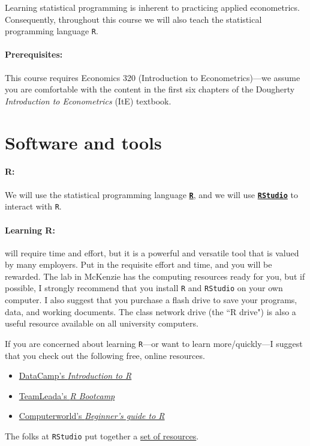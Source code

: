 \documentclass[10pt]{article}
\begin{document}
Learning statistical programming is inherent to practicing applied econometrics. Consequently, throughout this course we will also teach the statistical programming language \texttt{{R}}.

\paragraph{Prerequisites:} This course requires Economics 320 (Introduction to Econometrics)---we assume you are comfortable with the content in the first six chapters of the Dougherty \textit{Introduction to Econometrics} (ItE) textbook.

\section*{Software and tools}

\paragraph{R:} We will use the statistical programming language \href{https://www.r-project.org/}{\textbf{\texttt{R}}}, and we will use \href{https://www.rstudio.com}{\textbf{\texttt{RStudio}}} to interact with \texttt{R}.

\paragraph{Learning R:} will require time and effort, but it is a powerful and versatile tool that is valued by many employers. Put in the requisite effort and time, and you will be rewarded. The lab in McKenzie has the computing resources ready for you, but if possible, I strongly recommend that you install \texttt{R} and \texttt{RStudio} on your own computer. I also suggest that you purchase a flash drive to save your programs, data, and working documents. The class network drive (the ``R drive") is also a useful resource available on all university computers.

If you are concerned about learning \texttt{R}---or want to learn more/quickly---I suggest that you check out the following free, online resources.
\begin{itemize}
  \item \href{https://www.datacamp.com/courses/free-introduction-to-r}{DataCamp's \textit{Introduction to R}}
  \item \href{https://www.teamleada.com/courses/r-bootcamp}{TeamLeada's \textit{R Bootcamp}}
  \item \href{https://www.computerworld.com/article/2497143/business-intelligence-beginner-s-guide-to-r-introduction.html}{Computerworld's \textit{Beginner's guide to R}}
\end{itemize}
The folks at \texttt{RStudio} put together a \href{https://education.rstudio.com/learn/beginner/}{set of resources}.
\end{document}
